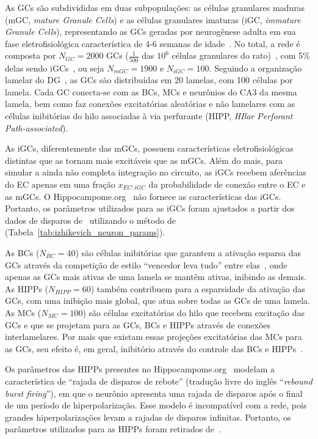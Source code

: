 As GCs são subdivididas em duas subpopulações: as células granulares maduras (mGC, \textit{mature Granule Cells}) e as células
granulares imaturas (iGC, \textit{immature Granule Cells}), representando as GCs geradas por neurogênese adulta em sua fase
eletrofisiológica característica de 4-6 semanas de idade~\cite{aimoneRegulation2014}. No total, a rede é composta por $N_{GC} =
2000$ GCs ($\frac{1}{500}$ das $10^6$ células granulares do rato)~\cite{westUnbiased1991}, com 5\% delas sendo
iGCs~\cite{cameronAdult2001}, ou seja $N_{mGC} = 1900$ e $N_{iGC} = 100$. Seguindo a organização lamelar do
DG~\cite{sloviterUpdating2012}, as GCs são distribuídas em 20 lamelas, com 100 células por lamela. Cada GC conecta-se com as BCs,
MCs e neurônios do CA3 da mesma lamela, bem como faz conexões excitatórias aleatórias e não lamelares com as células inibitórias
do hilo associadas à via perfurante (HIPP, \textit{HIlar Perforant Path-associated}).

As iGCs, diferentemente das mGCs, possuem características eletrofisiológicas distintas que as tornam mais excitáveis que as mGCs.
Além do mais, para simular a ainda não completa integração no circuito, as iGCs recebem aferências do EC apenas em uma fração
$x_{EC:iGC}$ da probabilidade de conexão entre o EC e as mGCs. O Hippocampome.org~\cite{wheelerHippocampomeorg2023} não fornece as
características das iGCs. Portanto, os parâmetros utilizados para as iGCs foram ajustados a partir dos dados de disparos
de~ utilizando o método de~
(Tabela~\ref{tab:izhikevich_neuron_params}).

As BCs ($N_{BC} = 40$) são células inibitórias que garantem a ativação esparsa das GCs através da competição de estilo ``vencedor
leva tudo'' entre elas~\cite{coultripCortical1992,chavlisDendrites2017,kimAdult2024}, onde apenas as GCs mais ativas de uma lamela
se mantêm ativas, inibindo as demais. As HIPPs ($N_{HIPP} = 60$) também contribuem para a esparsidade da ativação das GCs, com uma
inibição mais global, que atua sobre todas as GCs de uma lamela. As MCs ($N_{MC} = 100$) são células excitatórias do hilo que
recebem excitação das GCs e que se projetam para as GCs, BCs e HIPPs através de conexões interlamelares. Por mais que existam
essas projeções excitatórias das MCs para as GCs, seu efeito é, em geral, inibitório através do controle das BCs e
HIPPs~\cite{myersRole2009,scharfmanHilar2013}.

Os parâmetros das HIPPs presentes no Hippocampome.org~\cite{wheelerHippocampomeorg2023} modelam a característica de ``rajada de
disparos de rebote'' (tradução livre do inglês ``\textit{rebound burst firing}''), em que o neurônio apresenta uma rajada de
disparos após o final de um período de hiperpolarização. Esse modelo é incompatível com a rede, pois grandes hiperpolarizações
levam a rajadas de disparos infinitas. Portanto, os parâmetros utilizados para as HIPPs foram retirados
de~.

